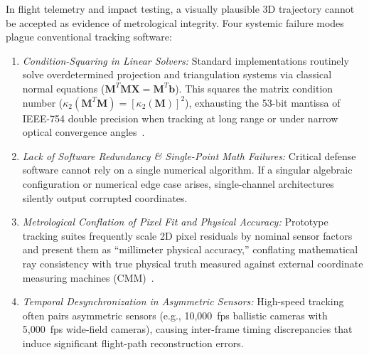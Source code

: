 \documentclass[journal]{IEEEtran}
\newcommand{\X}{\mathbf{X}}
\newcommand{\bb}{\mathbf{b}}
\begin{document}
In flight telemetry and impact testing, a visually plausible 3D trajectory cannot be accepted as evidence of metrological integrity. Four systemic failure modes plague conventional tracking software:
\begin{enumerate}
    \item \textit{Condition-Squaring in Linear Solvers:} Standard implementations routinely solve overdetermined projection and triangulation systems via classical normal equations ($\mathbf{M}^T\mathbf{M}\X = \mathbf{M}^T\bb$). This squares the matrix condition number ($\kappa_2(\mathbf{M}^T\mathbf{M}) = [\kappa_2(\mathbf{M})]^2$), exhausting the 53-bit mantissa of IEEE-754 double precision when tracking at long range or under narrow optical convergence angles~\cite{golub2013matrix}.
    \item \textit{Lack of Software Redundancy & Single-Point Math Failures:} Critical defense software cannot rely on a single numerical algorithm. If a singular algebraic configuration or numerical edge case arises, single-channel architectures silently output corrupted coordinates.
    \item \textit{Metrological Conflation of Pixel Fit and Physical Accuracy:} Prototype tracking suites frequently scale 2D pixel residuals by nominal sensor factors and present them as ``millimeter physical accuracy,'' conflating mathematical ray consistency with true physical truth measured against external coordinate measuring machines (CMM)~\cite{hartley2004multiple}.
    \item \textit{Temporal Desynchronization in Asymmetric Sensors:} High-speed tracking often pairs asymmetric sensors (e.g., 10,000~fps ballistic cameras with 5,000~fps wide-field cameras), causing inter-frame timing discrepancies that induce significant flight-path reconstruction errors.
\end{enumerate}
\end{document}
